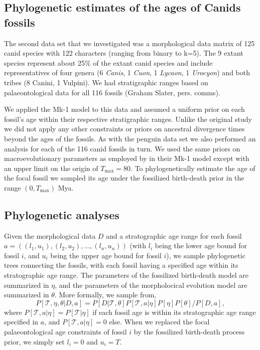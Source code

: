 \documentclass[11pt]{article}
\newcommand{\Mstrict}{{Mk-1}}
\newcommand{\ncanidfossils}{{116}}
\begin{document}
\subsection*{Phylogenetic estimates of the ages of Canids fossils}

The second data set that we investigated was a morphological data matrix of 125 canid species \cite[9 extant and \ncanidfossils{} fossil;][]{Slater2015} with 122 characters (ranging from binary to k=5).
The 9 extant species represent about 25\% of the extant canid species and include representatives of four genera (6 {\em Canis}, 1 {\em Cuon}, 1 {\em Lycaon}, 1 {\em Urocyon}) and both tribes (8 Canini, 1 Vulpini). 
We had stratigraphic ranges based on palaeontological data for all \ncanidfossils{} fossils (Graham Slater, pers. comms). 

We applied the \Mstrict{} model to this data and assumed a uniform prior on each fossil's age within their respective stratigraphic ranges. Unlike the original study \cite{Slater2015} we did not apply any other constraints or priors on ancestral divergence times beyond the ages of the fossils. 
As with the penguin data set we also performed an analysis for each of the \ncanidfossils{} canid fossils in turn. We used the same priors on macroevolutionary parameters as employed by \cite{gavryushkina2015bayesian} in their \Mstrict{} model except with an upper limit on the origin of $T_\text{max} = 80$. To phylogenetically estimate the age of the focal fossil we sampled its age under the fossilized birth-death prior in the range $(0,T_\text{max})$ Mya.

\subsection*{Phylogenetic analyses}

Given the morphological data $D$ and a stratographic age range for each fossil $a = ((l_1,u_1),(l_2, u_2),\ldots,(l_n,u_n))$ (with $l_i$ being the lower age bound for fossil $i$, and $u_i$ being the upper age bound for fossil $i$), we sample phylogenetic trees connecting the fossils, with each fossil having a specified age within its stratographic age range. The parameters of the fossilized birth-death model are summarized in $\eta$, and the parameters  of the morpholocical evolution model are summarized in $\theta$. More formally, we sample from,
$$P[\mathcal{T},\eta, \theta | D, a] = P[D|\mathcal{T},\theta] P[\mathcal{T},a|\eta] P[\eta] P[\theta]/P[D,a],$$
where $ P[\mathcal{T},a|\eta] =  P[\mathcal{T}|\eta] $ if each fossil age is within its stratographic age range specified in $a$, and $ P[\mathcal{T},a|\eta] =0$ else.
When we replaced the focal  palaeontological age constraints of fossil $i$  by 
the fossilized birth-death process prior, we simply set $l_i=0$ and $u_i=T$.
\end{document}
